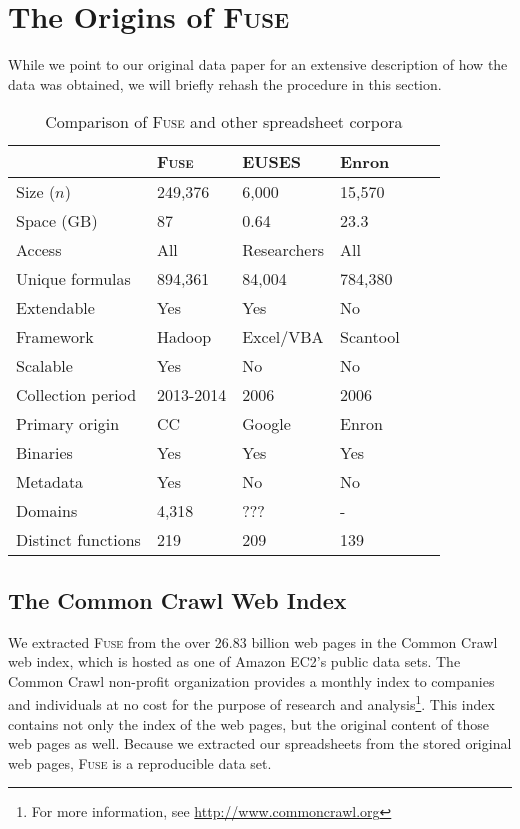 \documentclass[conference]{IEEEtran}
\begin{document}
\section{The Origins of \textsc{Fuse}}

While we point to our original data paper for an extensive description of how the data was obtained, we will briefly rehash the procedure in this section.

\begin{table}[!t]
\caption{Comparison of \textsc{Fuse} and other spreadsheet corpora\label{tab:corpora}}
\centering
\begin{tabular}{llllll}
\toprule
 & \textbf{\textsc{Fuse}} & \textbf{EUSES} & \textbf{Enron} \\
\midrule
Size ($n$) & 249,376 & 6,000 & 15,570\\
Space (GB) & 87  & 0.64 & 23.3\\
Access & All & Researchers & All \\
Unique formulas & 894,361 & 84,004 & 784,380 \\
Extendable & Yes & Yes & No\\
Framework & Hadoop & Excel/VBA & Scantool \\
Scalable & Yes & No & No\\
Collection period & 2013-2014 & 2006 & 2006 \\
Primary origin & CC & Google & Enron \\
Binaries & Yes  & Yes & Yes \\
Metadata & Yes & No & No \\
Domains & 4,318 & ??? & - \\
Distinct functions & 219 & 209 & 139 \\
\bottomrule
\end{tabular}
\end{table}

\subsection{The Common Crawl Web Index}

We extracted \textsc{Fuse} from the over 26.83 billion web pages in the Common Crawl web index, which is hosted as one of Amazon EC2's public data sets. 
The Common Crawl non-profit organization provides a monthly index to companies and individuals at no cost for the purpose of research and analysis\footnote{For more information, see \url{http://www.commoncrawl.org}}.
This index contains not only the index of the web pages, but the original content of those web pages as well.
Because we extracted our spreadsheets from the stored original web pages, \textsc{Fuse} is a reproducible data set.
\end{document}
